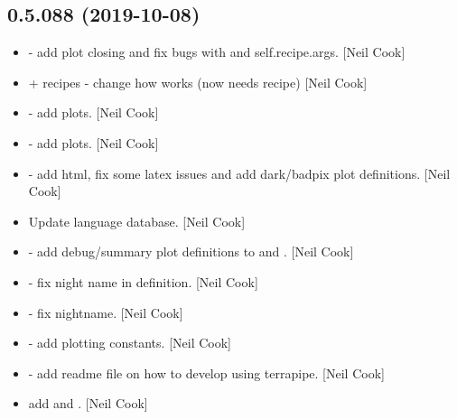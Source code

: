 \documentclass[a4paper,10pt,english]{report}
\begin{document}
\subsection{0.5.088 (2019-10-08)}
\label{\detokenize{misc/changelog:id54}}\begin{itemize}
\item {} 
 - add plot closing and fix bugs
with  and self.recipe.args. {[}Neil Cook{]}

\item {} 
 +  recipes - change how  works
(now needs recipe) {[}Neil Cook{]}

\item {} 
 - add plots. {[}Neil Cook{]}

\item {} 
 - add plots. {[}Neil Cook{]}

\item {} 
 - add html, fix some latex issues and add dark/badpix
plot definitions. {[}Neil Cook{]}

\item {} 
Update language database. {[}Neil Cook{]}

\item {} 
 - add debug/summary plot
definitions to  and . {[}Neil Cook{]}

\item {} 
 - fix night name in
 definition. {[}Neil Cook{]}

\item {} 
 - fix nightname. {[}Neil Cook{]}

\item {} 
 - add plotting constants. {[}Neil Cook{]}

\item {} 
 - add readme file on how to develop using
terrapipe. {[}Neil Cook{]}

\item {} 
 add  and .
{[}Neil Cook{]}

\end{itemize}
\end{document}
